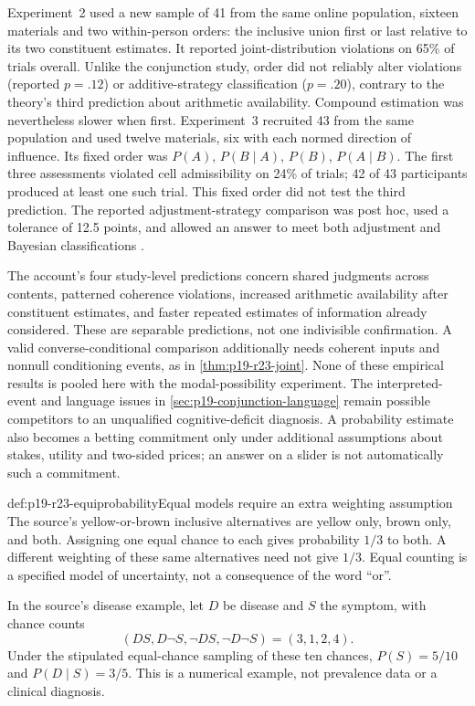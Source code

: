 Experiment~2 used a new sample of 41 from the same online population,
sixteen materials and two within-person orders: the inclusive union first
or last relative to its two constituent estimates. It reported
joint-distribution violations on 65\% of trials overall. Unlike the
conjunction study, order did not reliably alter violations (reported
\(p=.12\)) or additive-strategy classification (\(p=.20\)), contrary
to the theory's third prediction about arithmetic availability. Compound
estimation was nevertheless slower when first. Experiment~3 recruited
43 from the same population and used twelve materials, six with each
normed direction of influence. Its fixed order was \(P(A)\),
\(P(B\mid A)\), \(P(B)\), \(P(A\mid B)\). The first three
assessments violated cell admissibility on 24\% of trials; 42 of 43
participants produced at least one such trial. This fixed order did
not test the third prediction. The reported adjustment-strategy
comparison was post hoc, used a tolerance of 12.5 points, and allowed
an answer to meet both adjustment and Bayesian classifications
\cite[early-view pp.~23--28]{KhemlaniLotsteinJohnsonLaird2015Naive}.

The account's four study-level predictions concern shared judgments
across contents, patterned coherence violations, increased arithmetic
availability after constituent estimates, and faster repeated estimates
of information already considered. These are separable predictions,
not one indivisible confirmation. A valid converse-conditional
comparison additionally needs coherent inputs and nonnull conditioning
events, as in \cref{thm:p19-r23-joint}. None of these empirical results
is pooled here with the modal-possibility experiment.
The interpreted-event and language issues in
\cref{sec:p19-conjunction-language} remain possible competitors to an
unqualified cognitive-deficit diagnosis. A probability estimate also
becomes a betting commitment only under additional assumptions about
stakes, utility and two-sided prices; an answer on a slider is not
automatically such a commitment.

\begin{hbexample}{def:p19-r23-equiprobability}{Equal models require an extra weighting assumption}
The source's yellow-or-brown inclusive alternatives are yellow only,
brown only, and both. Assigning one equal chance to each gives probability
\(1/3\) to both. A different weighting of these same alternatives
need not give \(1/3\). Equal counting is a specified model of uncertainty,
not a consequence of the word ``or''.

In the source's disease example, let \(D\) be disease and \(S\) the
symptom, with chance counts
\[
 (DS,D\neg S,\neg DS,\neg D\neg S)=(3,1,2,4).
\]
Under the stipulated equal-chance sampling of these ten chances,
\(P(S)=5/10\) and \(P(D\mid S)=3/5\). This is a numerical
example, not prevalence data or a clinical diagnosis.
\end{hbexample}

